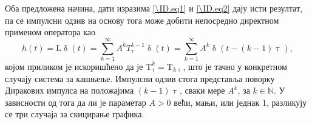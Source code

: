 Оба предложена начина, дати изразима \eqref{\ID.eq1} и \eqref{\ID.eq2} дају исти резултат, па се импулсни одзив на основу тога може добити непосредно директном 
применом оператора као 
\begin{equation}
    h(t) = \mathrm L \updelta(t) = \sum_{k = 1}^{\infty} A^{k} T_{\uptau}^{k-1} \updelta(t) = 
    \sum_{k = 1}^{\infty} A^{k} \updelta(t - (k-1)\uptau),
\end{equation}
којом приликом је искоришћено да је $\mathrm T^k_{\uptau} = \mathrm T_{k\uptau}$, што је тачно у конкретном случају система за кашњење.
Импулсни одзив стога представља поворку Диракових импулса на положајима $(k-1)\uptau$, сваки мере $A^k$, за $k \in \mathbb N$. 
У зависности од тога да ли је параметар $A > 0$ 
већи, мањи, или једнак 1, разликују се три случаја за скицирање графика. 


